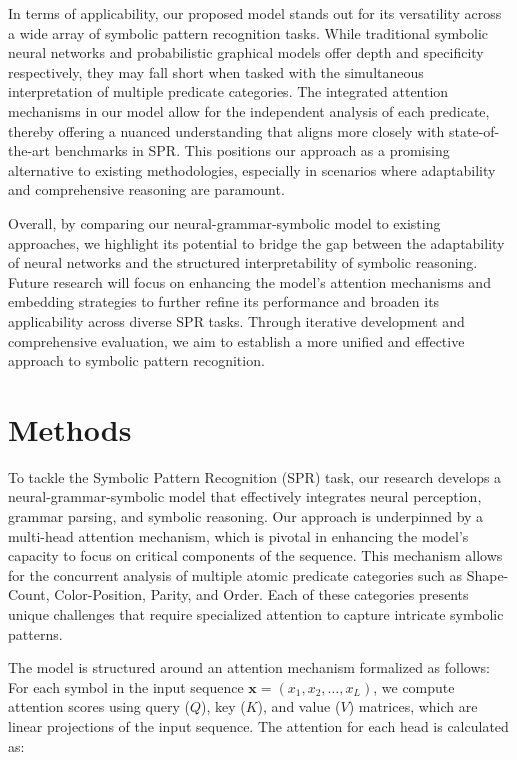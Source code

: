 \documentclass{article}
\begin{document}
In terms of applicability, our proposed model stands out for its versatility across a wide array of symbolic pattern recognition tasks. While traditional symbolic neural networks and probabilistic graphical models offer depth and specificity respectively, they may fall short when tasked with the simultaneous interpretation of multiple predicate categories. The integrated attention mechanisms in our model allow for the independent analysis of each predicate, thereby offering a nuanced understanding that aligns more closely with state-of-the-art benchmarks in SPR. This positions our approach as a promising alternative to existing methodologies, especially in scenarios where adaptability and comprehensive reasoning are paramount.

Overall, by comparing our neural-grammar-symbolic model to existing approaches, we highlight its potential to bridge the gap between the adaptability of neural networks and the structured interpretability of symbolic reasoning. Future research will focus on enhancing the model's attention mechanisms and embedding strategies to further refine its performance and broaden its applicability across diverse SPR tasks. Through iterative development and comprehensive evaluation, we aim to establish a more unified and effective approach to symbolic pattern recognition.

\section{Methods}
To tackle the Symbolic Pattern Recognition (SPR) task, our research develops a neural-grammar-symbolic model that effectively integrates neural perception, grammar parsing, and symbolic reasoning. Our approach is underpinned by a multi-head attention mechanism, which is pivotal in enhancing the model's capacity to focus on critical components of the sequence. This mechanism allows for the concurrent analysis of multiple atomic predicate categories such as Shape-Count, Color-Position, Parity, and Order. Each of these categories presents unique challenges that require specialized attention to capture intricate symbolic patterns.

The model is structured around an attention mechanism formalized as follows: For each symbol in the input sequence $\mathbf{x} = (x_1, x_2, \ldots, x_L)$, we compute attention scores using query ($Q$), key ($K$), and value ($V$) matrices, which are linear projections of the input sequence. The attention for each head is calculated as:
\end{document}

